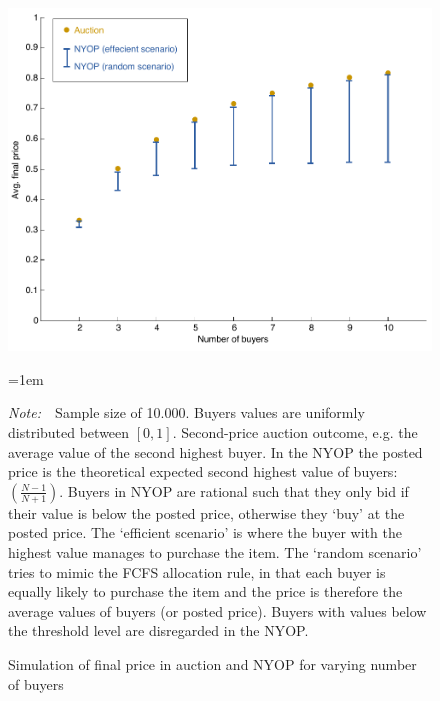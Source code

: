 \documentclass[a4paper,12pt]{article}
\newcommand{\Figtext}[1]{%
	\begin{tablenotes}[para,flushleft]
		\hangindent=1em
		\footnotesize
		\raggedright
		#1
	\end{tablenotes}
}
\newcommand{\Fignote}[1]{\Figtext{\emph{Note:~}~#1}}
\begin{document}
	\begin{figure}
	        \centering
	        \caption{Simulation of final price in auction and NYOP for varying number of buyers}
	        \includegraphics[width=\textwidth]{Figures/FinalPrice_Auction-NYOP}
			\label{fig:FinalPrice_Auction-NYOP}
			\Fignote{Sample size of 10.000. Buyers values are uniformly distributed between $[0,1]$. Second-price auction outcome, e.g. the average value of the second highest buyer. In the NYOP the posted price is the theoretical expected second highest value of buyers: $(\frac{N-1}{N+1})$. Buyers in NYOP are rational such that they only bid if their value is below the posted price, otherwise they `buy' at the posted price. The `efficient scenario' is where the buyer with the highest value manages to purchase the item. The `random scenario' tries to mimic the FCFS allocation rule, in that each buyer is equally likely to purchase the item and the price is therefore the average values of buyers (or posted price). Buyers with values below the threshold level are disregarded in the NYOP.}
	\end{figure}
	
\end{document}
